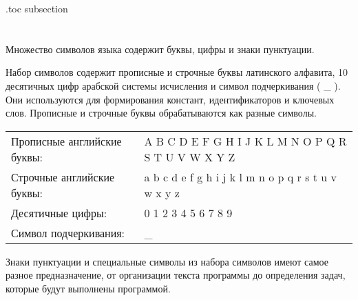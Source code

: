 \etocsettocdepth.toc {subsection}

\chapter{}
\label{sec:DataTypes}

\renewcommand{\arraystretch}{1.2} %
\renewcommand{\tabcolsep}{0.2cm}   %
\section{}

\subsection{}

Множество символов языка содержит буквы, цифры и знаки пунктуации.\killoverfullbefore

Набор символов содержит прописные и строчные буквы латинского алфавита, 10 десятичных цифр арабской системы исчисления и символ подчеркивания ( \_ ). Они используются для формирования констант, идентификаторов и ключевых слов. Прописные и строчные буквы обрабатываются как разные символы. 

\renewcommand{\arraystretch}{1.4} %
\renewcommand{\tabcolsep}{0.5cm}   %
\begin{center}
\begin{tabular}{ l l }
Прописные английские буквы: & A B C D E F G H I J K L M N O P Q R S T U V W X Y Z \\
Строчные английские буквы: & a b c d e f g h i j k l m n o p q r s t u v w x y z  \\
Десятичные цифры: & 0 1 2 3 4 5 6 7 8 9  \\
Символ подчеркивания:  & \_ \\
\end{tabular}
\end{center}

Знаки пунктуации и специальные символы из набора символов имеют самое разное предназначение, от организации текста программы до определения задач, которые будут выполнены программой.

